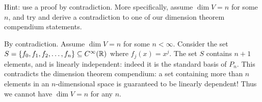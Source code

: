 Hint: use a proof by contradiction. More specifically, assume $\dim V=n$ for some $n$, and try and derive a contradiction to one of our dimension theorem compendium statements. 
\\
\begin{solution}
\noindent
By contradiction. Assume $\dim V=n$ for some $n<\infty$. Consider the set $S=\{f_0, f_1, f_2,\dots, f_{n}\}\subseteq C^\infty({\mathbb R})$ where $f_j(x)=x^j$. The set $S$ contains $n+1$ elements, and is linearly independent: indeed it is the standard basis of $P_{n}$. This contradicts the dimension theorem compendium: a set containing more than $n$ elements in an $n$-dimensional space is guaranteed to be linearly dependent! Thus we cannot have $\dim V=n$ for any $n$. 
\end{solution}
\ee
